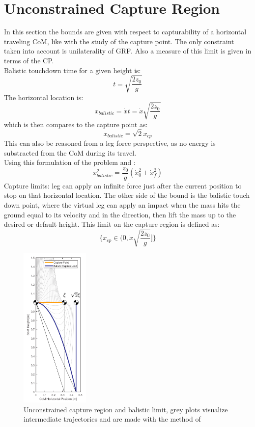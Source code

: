 \section{Unconstrained Capture Region}
In this section the bounds are given with respect to capturability of a horizontal traveling CoM, like with the study of the capture point. The only constraint taken into account is unilaterality of \ac{GRF}. Also a measure of this limit is given in terms of the CP.\\
Balistic touchdown time for a given height is:
\begin{equation}
	t = \sqrt{\frac{2z_0}{g}}
\end{equation}
The horizontal location is:
\begin{equation}
	x_{balistic}= \dot{x}t=\dot{x}\sqrt{\frac{2z_0}{g}} 
\end{equation}
which is then compares to the capture point as:
\begin{equation}
    x_{balistic}=\sqrt{2}x_{cp}
\end{equation}
This can also be reasoned from a leg force perspective, as no energy is substracted from the CoM during its travel. \\
Using this formulation of the problem and \Elip:
\begin{equation}
   x_{balistic}^2 = \frac{z_0}{g}(\dot{x}_0^2 + \dot{x}_f^2) 
\end{equation}
Capture limits: leg can apply an infinite force just after the current position to stop on that horizontal location. The other side of the bound is the balistic touch down point, where the virtual leg can apply an impact when the mass hits the ground equal to its velocity and in the direction, then lift the mass up to the desired or default height. This limit on the capture region is defined as:
\begin{equation}
\{x_{cp} \in (0, \dot{x}\sqrt{\frac{2z_0}{g}} ]\}
\end{equation}
\cite{koolen2016balance} 
\begin{figure}[h]
\centering
\includegraphics[width=0.3\textwidth]{STYLESTUFF/CPvsBalistic.png}
\caption{Unconstrained capture region and balistic limit, grey plots visualize intermediate trajectories and are made with the method of \cite{koolen2016balance}}
\label{fig:cpbal}
\end{figure}

